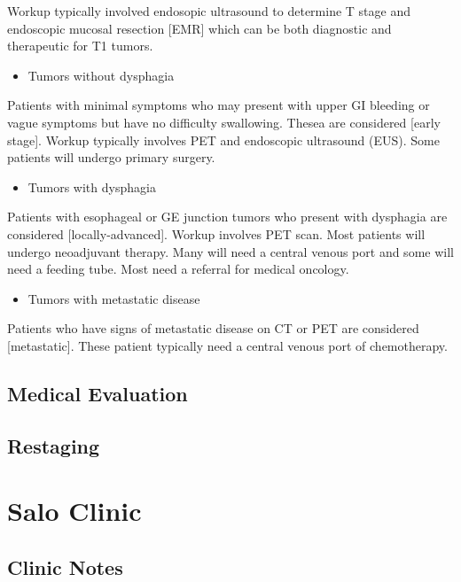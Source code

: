 \documentclass[
  letterpaper,
]{scrbook}
\providecommand{\tightlist}{%
  \setlength{\itemsep}{0pt}\setlength{\parskip}{0pt}}
\begin{document}
Workup typically involved endosopic ultrasound to determine T stage and
endoscopic mucosal resection {[}EMR{]} which can be both diagnostic and
therapeutic for T1 tumors.

\begin{itemize}
\tightlist
\item
  Tumors without dysphagia
\end{itemize}

Patients with minimal symptoms who may present with upper GI bleeding or
vague symptoms but have no difficulty swallowing. Thesea are considered
{[}early stage{]}. Workup typically involves PET and endoscopic
ultrasound (EUS). Some patients will undergo primary surgery.

\begin{itemize}
\tightlist
\item
  Tumors with dysphagia
\end{itemize}

Patients with esophageal or GE junction tumors who present with
dysphagia are considered {[}locally-advanced{]}. Workup involves PET
scan. Most patients will undergo neoadjuvant therapy. Many will need a
central venous port and some will need a feeding tube. Most need a
referral for medical oncology.

\begin{itemize}
\tightlist
\item
  Tumors with metastatic disease
\end{itemize}

Patients who have signs of metastatic disease on CT or PET are
considered {[}metastatic{]}. These patient typically need a central
venous port of chemotherapy.

\section{Medical Evaluation}\label{medical-evaluation}

\section{Restaging}\label{restaging}

\chapter{Salo Clinic}\label{mie_postop}

\section{Clinic Notes}\label{clinic-notes}
\end{document}
